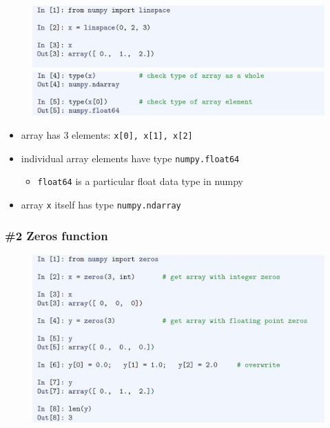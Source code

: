 \documentclass[english,14pt]{beamer}
\begin{document}
\begin{frame}[fragile]

\frametitle{}

\begin{figure}[ht]
	\centering
	\includegraphics[width=\textwidth]{figures/LLp47}
	\includegraphics[width=\textwidth]{figures/LLp48}
\end{figure}

\vspace*{-4mm}
	
\begin{itemize}
	\item array has $3$ elements: \texttt{x[0], x[1], x[2]}
	\item individual array elements have type \texttt{numpy.float64}
	\begin{itemize}
		\item \texttt{float64} is a particular float data type in numpy
	\end{itemize}
	\item array \texttt{x} itself has type \texttt{numpy.ndarray}

\end{itemize}

\end{frame}


\begin{frame}[fragile]

\frametitle{\#2 Zeros function}

\begin{figure}[ht]
	\centering
	\includegraphics[width=\textwidth]{figures/LLp49}
\end{figure}

\end{frame}
\end{document}
